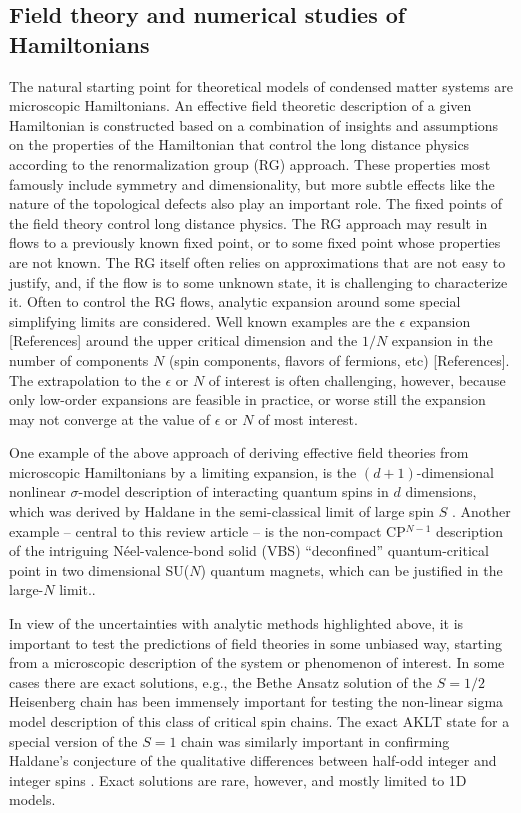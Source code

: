 \documentclass[range]{ar2e}
\begin{document}
\subsection{Field theory and numerical studies of Hamiltonians}

The natural starting point for theoretical models of condensed matter systems are microscopic Hamiltonians.
An effective field theoretic description  of a given Hamiltonian 
is constructed based on a combination of insights and assumptions on the properties of the Hamiltonian that control the long distance physics according to the renormalization group (RG) approach. These properties most famously include symmetry and dimensionality, but more subtle effects like the nature of the topological defects also play an important role.  The fixed points of the field theory control long distance physics.
The RG approach may result in flows to a previously known fixed point, or to some fixed point
whose properties are not known. The RG itself often relies on approximations that are not easy
to justify, and, if the flow is to some unknown state, it is challenging to characterize it. Often to control the RG flows, analytic expansion around some special simplifying limits are considered. Well known examples are the $\epsilon$ expansion {\color{red}[References]} 
around the upper critical dimension and the $1/N$ expansion in the number of components $N$ (spin components, flavors of fermions, etc)
{\color{red}[References]}. The
extrapolation to the $\epsilon$ or $N$ of interest is often challenging, however, because only low-order
expansions are feasible in practice, or worse still the expansion may not converge at the value of $\epsilon$ or $N$ of most interest.

One example of the above approach of deriving effective field theories from microscopic Hamiltonians by a limiting expansion, is the $(d+1)$-dimensional
nonlinear $\sigma$-model description of interacting quantum spins in $d$ dimensions, which was derived by Haldane in 
the semi-classical limit of large spin $S$ \cite{Haldane83,Chakravarty89,Auerbach94}. 
Another example -- central to this review article -- is the non-compact CP$^{N-1}$
description of the intriguing  N\'eel-valence-bond solid (VBS) ``deconfined'' quantum-critical point in two dimensional SU($N$) quantum magnets, which can be justified in the large-$N$ limit.\cite{Senthil04a,Sachdev08}.

In view of the uncertainties with analytic methods highlighted above, it is important to test the predictions of field theories in some unbiased way,
starting from a microscopic description of the system or phenomenon of interest. In some cases there are exact solutions, 
e.g., the Bethe Ansatz solution of the $S=1/2$ Heisenberg chain \cite{Bethe31} has been immensely important for testing 
the non-linear sigma model description of this class of critical spin chains. The exact AKLT state \cite{affleck88} for a special 
version of the $S=1$ chain was similarly important in confirming Haldane's conjecture of the qualitative differences between 
half-odd integer and integer spins \cite{Haldane83}. Exact solutions are rare, however, and mostly limited to 1D models.
 
\end{document}
